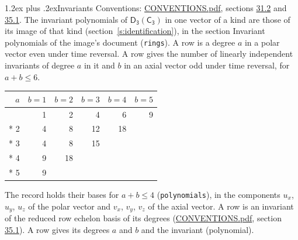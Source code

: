 \documentclass[10pt,a4paper]{article}
\makeatletter
\renewcommand\section{\@startsection{section}{1}{\z@}{-3ex plus -1ex minus -.2ex}%
  {1.2ex plus .2ex}{\normalfont\large\sffamily\bfseries\color{parttitle}}}
\numberwithin{equation}{section}
\newcommand{\grp}[1]{\mathsf{#1}}
\makeatother
\begin{document}
\section{Invariants}\label{s:invariants}
Conventions: \href{../../CONVENTIONS.pdf}{CONVENTIONS.pdf}, sections \href{../../CONVENTIONS.pdf\#conv.31.2}{31.2} and \href{../../CONVENTIONS.pdf\#conv.35.1}{35.1}.
The invariant polynomials of $\grp{D_{3}}(\grp{C_{3}})$ in one vector of a kind are those of its image of that kind (section~\ref{s:identification}), in the section Invariant polynomials of the image's document (\texttt{rings}).
\leavevmode\label{n:index.degree.polar}\label{n:index.degree.axial}A row is a degree $a$ in a polar vector even under time reversal. A row gives the number of linearly independent invariants of degree $a$ in it and $b$ in an axial vector odd under time reversal, for $a + b \le 6$.
{\small\begin{longtable}{@{}rrrrrr@{}}\toprule
$a$ & $b = 1$ & $b = 2$ & $b = 3$ & $b = 4$ & $b = 5$\\\midrule\endhead
\bottomrule\endfoot\endlastfoot
1 & 1 & 2 & 4 & 6 & 9\\*
2 & 4 & 8 & 12 & 18 & \\*
3 & 4 & 8 & 15 &  & \\*
4 & 9 & 18 &  &  & \\*
5 & 9 &  &  &  & \\
\bottomrule\end{longtable}}
\leavevmode\label{n:local.component.polar}\label{n:local.component.axial}The record holds their bases for $a + b \le 4$ (\texttt{polynomials}), in the components $u_{x}$, $u_{y}$, $u_{z}$ of the polar vector and $v_{x}$, $v_{y}$, $v_{z}$ of the axial vector. \label{n:head.polynomial}A row is an invariant of the reduced row echelon basis of its degrees (\href{../../CONVENTIONS.pdf}{CONVENTIONS.pdf}, section \href{../../CONVENTIONS.pdf\#conv.35.1}{35.1}). A row gives its degrees $a$ and $b$ and the invariant (polynomial).
\end{document}
